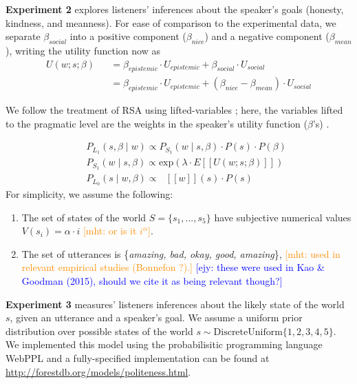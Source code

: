 \documentclass[10pt,letterpaper]{article}
\newcommand{\denote}[1]{\mbox{ $[\![ #1 ]\!]$}}
\newcommand{\mht}[1]{\textcolor{DarkOrange}{[mht: #1]}}
\newcommand{\ejy}[1]{\textcolor{Blue}{[ejy: #1]}}
\begin{document}
\textbf{Experiment 2} explores listeners' inferences about the speaker's goals (honesty, kindness, and meanness).
For ease of comparison to the experimental data, we separate $\beta_{social}$ into a positive component ($\beta_{nice}$) and a negative component ($\beta_{mean}$), writing the utility function now as
\begin{eqnarray*}
U(w;s; \beta) && = \beta_{epistemic}\cdot U_{epistemic} + \beta_{social} \cdot U_{social} \\
&&= \beta_{epistemic}\cdot U_{epistemic} + (\beta_{nice} - \beta_{mean}) \cdot U_{social}
\end{eqnarray*}


%
%
We follow the treatment of RSA using lifted-variables \cite{GoodmanLassiter2015, Kao2014, Degen2015}; here, the variables lifted to the pragmatic level are the weights in the speaker's utility function ($\beta$'s) .

%
\begin{eqnarray}
&&P_{L_1}(s, \beta \mid w)\propto P_{S_1}(w \mid s, \beta)\cdot P(s) \cdot P(\beta) \label{eq:L1}\\
&&P_{S_1}(w \mid s, \beta) \propto \mathrm{exp}(\lambda \cdot E[[U(w; s; \beta)]])\label{eq:S1}\\
&&P_{L_0}(s \mid w, \beta)\propto \denote{w}(s) \cdot P(s) \label{eq:L0}
\end{eqnarray}
%
For simplicity, we assume the following:
\begin{enumerate}
\item The set of states of the world $S = \{s_{1}, ...,  s_{5}\}$ have subjective numerical values $V(s_{i}) = \alpha \cdot i$ \mht{or is it $i^\alpha$}. 
\item The set of utterances is \{\emph{amazing, bad, okay, good, amazing}\},
  \mht{used in relevant empirical studies (Bonnefon ?).}
   \ejy{these were used in Kao \& Goodman (2015), should we cite it as being relevant though?}
\end{enumerate}

\textbf{Experiment 3} measures' listeners inferences about the likely state of the world $s$, given an utterance and a speaker's goal. 
We assume a uniform prior distribution over possible states of the world $s\sim \text{DiscreteUniform} \{1, 2, 3, 4, 5\}$. 
We implemented this model using the probabilisitic programming language WebPPL \cite{dippl} and a fully-specified implementation can be found at \url{http://forestdb.org/models/politeness.html}.
\end{document}
